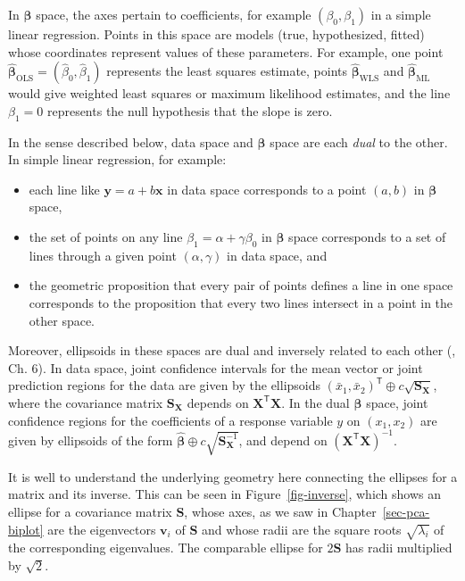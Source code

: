\documentclass[
  letterpaper,
  10pt,
  krantz2]{krantz}
\providecommand{\tightlist}{%
  \setlength{\itemsep}{0pt}\setlength{\parskip}{0pt}}\usepackage{longtable,booktabs,array}
\begin{document}
In \(\mathbf{\beta}\) space, the axes pertain to coefficients, for
example \((\beta_0, \beta_1)\) in a simple linear regression. Points in
this space are models (true, hypothesized, fitted) whose coordinates
represent values of these parameters. For example, one point
\(\widehat{\mathbf{\beta}}_{\text{OLS}} = (\hat{\beta}_0, \hat{\beta}_1)\)
represents the least squares estimate, points
\(\widehat{\mathbf{\beta}}_{\text{WLS}}\) and
\(\widehat{\mathbf{\beta}}_{\text{ML}}\) would give weighted least
squares or maximum likelihood estimates, and the line \(\beta_1 = 0\)
represents the null hypothesis that the slope is zero.

In the sense described below, data space and \(\boldsymbol{\beta}\)
space are each \emph{dual} to the other. In simple linear regression,
for example:

\begin{itemize}
\tightlist
\item
  each line like \(\mathbf{y} = a + b \mathbf{x}\) in data space
  corresponds to a point \((a,b)\) in \(\mathbf{\beta}\) space,
\item
  the set of points on any line \(\beta_1 = \alpha + \gamma \beta_0\) in
  \(\mathbf{\beta}\) space corresponds to a set of lines through a given
  point \((\alpha, \gamma)\) in data space, and
\item
  the geometric proposition that every pair of points defines a line in
  one space corresponds to the proposition that every two lines
  intersect in a point in the other space.
\end{itemize}

Moreover, ellipsoids in these spaces are dual and inversely related to
each other (, Ch. 6). In data
space, joint confidence intervals for the mean vector or joint
prediction regions for the data are given by the ellipsoids
\((\bar{x}_1, \bar{x}_2)^\mathsf{T} \oplus c \sqrt{\mathbf{S}_{\mathbf{X}}}\),
where the covariance matrix \(\mathbf{S}_{\mathbf{X}}\) depends on
\(\mathbf{X}^\mathsf{T}\mathbf{X}\). In the dual \(\mathbf{\beta}\)
space, joint confidence regions for the coefficients of a response
variable \(y\) on \((x_1, x_2)\) are given by ellipsoids of the form
\(\widehat{\mathbf{\beta}} \oplus c \sqrt{\mathbf{S}_{\mathbf{X}}^{-1}}\),
and depend on \(\mathbf{(\mathbf{X}^\mathsf{T}\mathbf{X})}^{-1}\).

It is well to understand the underlying geometry here connecting the
ellipses for a matrix and its inverse. This can be seen in
Figure~\ref{fig-inverse}, which shows an ellipse for a covariance matrix
\(\mathbf{S}\), whose axes, as we saw in Chapter~\ref{sec-pca-biplot}
are the eigenvectors \(\mathbf{v}_i\) of \(\mathbf{S}\) and whose radii
are the square roots \(\sqrt{\lambda_i}\) of the corresponding
eigenvalues. The comparable ellipse for \(2 \mathbf{S}\) has radii
multiplied by \(\sqrt{2}\).
\end{document}
